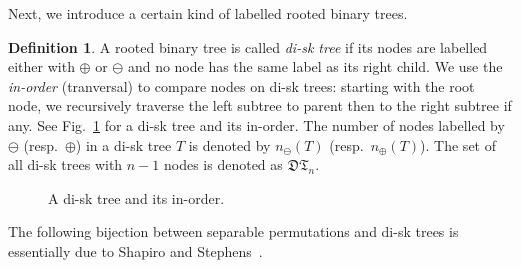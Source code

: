 \documentclass[12pt]{amsart}
\numberwithin{equation}{section}
\theoremstyle{plain}
\theoremstyle{definition}
\newtheorem{Def}[theorem]{Definition}
\def\D{\mathfrak{D}}
\def\T{\mathfrak{T}}
\begin{document}
Next, we introduce a certain kind of labelled rooted binary trees. 
\begin{Def}\label{diskorder}
A  rooted  binary tree is called   \emph{di-sk tree} if its nodes are labelled either with  $\oplus$ or $\ominus$ and no node has the same label as its right child.  We use  the \emph{in-order} (tranversal) to compare nodes on di-sk trees:  starting with the root node, we recursively traverse the left subtree to parent then to the right subtree if any. See Fig.~\ref{di-sk} for a di-sk tree and its in-order.
The number of nodes labelled by $\ominus$ (resp.~$\oplus$)  in a di-sk tree $T$  is denoted by $n_\ominus(T)$ (resp.~$n_\oplus(T)$). The set of all di-sk trees with $n-1$ nodes is denoted as $\D\T_n$. 
\end{Def}

 \begin{figure}
\caption{A di-sk tree and its in-order.\label{di-sk}}
\end{figure}

The following bijection between separable permutations and  di-sk trees is essentially due to Shapiro and Stephens~\cite{sh}.
\end{document}
